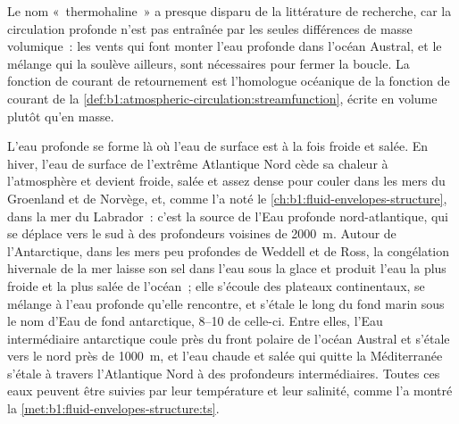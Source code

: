 Le nom «~thermohaline~» a presque disparu de la littérature de recherche, car
la circulation profonde n'est pas entraînée par les seules différences de masse volumique~: les vents qui
font monter l'eau profonde dans l'océan Austral, et le mélange qui la soulève ailleurs,
sont nécessaires pour fermer la boucle. La fonction de courant de retournement est l'homologue océanique
de la fonction de courant de la \cref{def:b1:atmospheric-circulation:streamfunction},
écrite en volume plutôt qu'en masse.

L'eau profonde se forme là où l'eau de surface est à la fois froide et salée. En hiver, l'eau de
surface de l'extrême Atlantique Nord cède sa chaleur à l'atmosphère et devient
froide, salée et assez dense pour couler dans les mers du Groenland et de Norvège, et, comme l'a noté
le \cref{ch:b1:fluid-envelopes-structure}, dans la mer du Labrador~: c'est la
source de l'Eau profonde nord-atlantique, qui se déplace vers le sud à des profondeurs voisines de
\qty{2000}{m}. Autour de l'Antarctique, dans les mers peu profondes de
Weddell et de Ross, la congélation hivernale de la mer laisse son sel dans l'eau
sous la glace et produit l'eau la plus froide et la plus salée de l'océan~; elle s'écoule
des plateaux continentaux, se mélange à l'eau profonde qu'elle rencontre, et s'étale le long
du fond marin sous le nom d'Eau de fond antarctique, \qtyrange{8}{10}{\sverdrup} de celle-ci. Entre
elles, l'Eau intermédiaire antarctique coule près du front polaire de l'océan Austral
et s'étale vers le nord près de \qty{1000}{m}, et l'eau chaude et salée qui quitte la
Méditerranée s'étale à travers l'Atlantique Nord à des profondeurs intermédiaires. Toutes
ces eaux peuvent être suivies par leur température et leur salinité, comme l'a montré la
\cref{met:b1:fluid-envelopes-structure:ts}.

